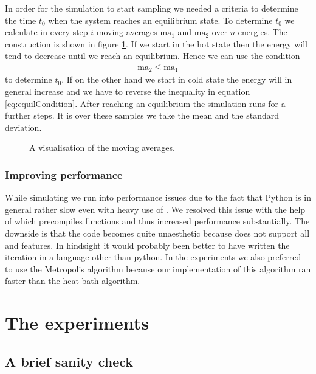 In order for the simulation to start sampling we needed a criteria to determine the time $t_0$ when the system reaches an equilibrium state.
 To determine $t_0$ we calculate in every step $i$ moving averages $\text{ma}_1$ and $\text{ma}_2$ over $n$ energies. The construction is shown in figure \ref{fi:movingAverages}. If we start in the hot state then the energy will tend to decrease until we reach an equilibrium. Hence we can use the condition
\begin{align}
	\text{ma}_2 \leq \text{ma}_1 \label{eq:equilCondition}
\end{align}
to determine $t_0$. If on the other hand we start in cold state the energy will in general increase and we have to reverse the inequality in equation \eqref{eq:equilCondition}. After reaching an equilibrium the simulation runs for a further  steps. It is over these samples we take the mean and the standard deviation.

\begin{figure}
\centering

\caption{A visualisation of the moving averages.}
\label{fi:movingAverages}
\end{figure}

\subsubsection{Improving performance}

While simulating we run into performance issues due to the fact that Python is in general rather slow even with heavy use of . We resolved this issue with the help of  which precompiles functions and thus increased performance substantially. The downside is that the code becomes quite unaesthetic because  does not support all  and  features. In hindsight it would probably been better to have written the iteration in a language other than python.
In the experiments we also preferred to use the Metropolis algorithm because our implementation of this algorithm ran faster than the heat-bath algorithm.

\section{The experiments}

\subsection{A brief sanity check}

